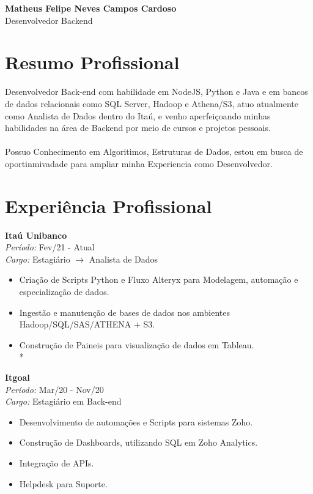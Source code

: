 \documentclass[a4paper,10pt]{article}
\begin{document}
\begin{center}
    \textbf{\LARGE Matheus Felipe Neves Campos Cardoso} \\
    Desenvolvedor Backend
    \end{center}
\begin{minipage}[t]{0.60\textwidth}
    \section*{\faUser \space Resumo Profissional}
    Desenvolvedor Back-end com habilidade em NodeJS, Python e Java e em bancos de dados relacionais como SQL Server, Hadoop e Athena/S3, atuo atualmente como Analista de Dados dentro do Itaú, e venho aperfeiçoando minhas habilidades na área de Backend por meio de cursos e projetos pessoais.\\\\
    Possuo Conhecimento em Algoritimos, Estruturas de Dados, estou em busca de oportinmivadade para ampliar minha Experiencia como Desenvolvedor.
    
    \section*{\faBriefcase \space Experiência Profissional}
        \textbf{Itaú Unibanco} \\
        \textit{Período:} Fev/21 - Atual \\
        \textit{Cargo:} Estagiário $\rightarrow$ Analista de Dados

        \begin{itemize}[left=0pt]
            \item Criação de Scripts Python e Fluxo Alteryx para Modelagem, automação e especialização de dados.
            \item Ingestão e manutenção de bases de dados nos ambientes Hadoop/SQL/SAS/ATHENA + S3.
            \item Construção de Paineis para visualização de dados em Tableau. \\*
        \end{itemize}

        \textbf{Itgoal} \\
        \textit{Período:} Mar/20 - Nov/20 \\
        \textit{Cargo:} Estagiário em Back-end

        \begin{itemize}[left=0pt]
            \item	Desenvolvimento de automações e Scripts para sistemas Zoho.
            \item	Construção de Dashboards, utilizando SQL em Zoho Analytics.
            \item	Integração de APIs.
            \item	Helpdesk para Suporte.
        \end{itemize}


\end{minipage}
\end{document}

